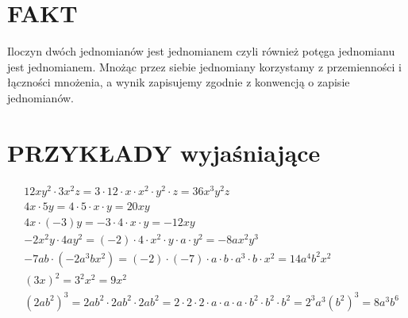 \documentclass[10pt]{article}
\begin{document}
\section*{FAKT}
Iloczyn dwóch jednomianów jest jednomianem czyli również potęga jednomianu jest jednomianem. Mnożąc przez siebie jednomiany korzystamy z przemienności i łączności mnożenia, a wynik zapisujemy zgodnie z konwencją o zapisie jednomianów.

\section*{PRZYKŁADY wyjaśniające}
\[
\begin{aligned}
& 12 x y^{2} \cdot 3 x^{2} z=3 \cdot 12 \cdot x \cdot x^{2} \cdot y^{2} \cdot z=36 x^{3} y^{2} z \\
& 4 x \cdot 5 y=4 \cdot 5 \cdot x \cdot y=20 x y \\
& 4 x \cdot(-3) y=-3 \cdot 4 \cdot x \cdot y=-12 x y \\
& -2 x^{2} y \cdot 4 a y^{2}=(-2) \cdot 4 \cdot x^{2} \cdot y \cdot a \cdot y^{2}=-8 a x^{2} y^{3} \\
& -7 a b \cdot\left(-2 a^{3} b x^{2}\right)=(-2) \cdot(-7) \cdot a \cdot b \cdot a^{3} \cdot b \cdot x^{2}=14 a^{4} b^{2} x^{2} \\
& (3 x)^{2}=3^{2} x^{2}=9 x^{2} \\
& \left(2 a b^{2}\right)^{3}=2 a b^{2} \cdot 2 a b^{2} \cdot 2 a b^{2}=2 \cdot 2 \cdot 2 \cdot a \cdot a \cdot a \cdot b^{2} \cdot b^{2} \cdot b^{2}=2^{3} a^{3}\left(b^{2}\right)^{3}=8 a^{3} b^{6}
\end{aligned}
\]
\end{document}
